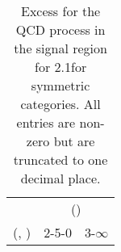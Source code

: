 \begin{table}[h!]
\tiny
\centering
\caption{Excess for the QCD process in the signal region for 2.1\ifb for symmetric categories. All entries are non-zero but are truncated to one decimal place.\label{tab:excesssep_sig_qcd_sym}}
\begin{tabular}
{ccc}
	\hline\hline
	& \multicolumn{2}{c}{\scalht (\gev)} \\ 
	 (\njet,  \nb) & 2-5-0 & 3-$\infty$ \\ [0.8ex] 
\hline
	\hline
	\hline
\end{tabular}
\end{table}
